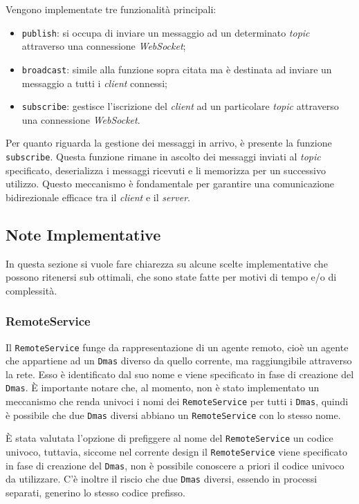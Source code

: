 Vengono implementate tre funzionalità principali:
\begin{itemize}
    \item \texttt{publish}: si occupa di inviare un messaggio ad un determinato \textit{topic} attraverso una connessione \textit{WebSocket};
    \item \texttt{broadcast}: simile alla funzione sopra citata ma è destinata ad inviare un messaggio a tutti i \textit{client} connessi;
    \item \texttt{subscribe}: gestisce l'iscrizione del \textit{client} ad un particolare \textit{topic} attraverso una connessione \textit{WebSocket}.
\end{itemize}

Per quanto riguarda la gestione dei messaggi in arrivo, è presente la funzione \texttt{subscribe}.
Questa funzione rimane in ascolto dei messaggi inviati al \textit{topic} specificato, deserializza i messaggi ricevuti e li memorizza per un successivo utilizzo.
Questo meccanismo è fondamentale per garantire una comunicazione bidirezionale efficace tra il \textit{client} e il  \textit{server}.

\subsection{Note Implementative}
In questa sezione si vuole fare chiarezza su alcune scelte implementative che possono ritenersi sub ottimali, che sono state fatte per motivi di tempo e/o di complessità.

\subsubsection{RemoteService}
Il \texttt{RemoteService} funge da rappresentazione di un agente remoto, cioè un agente che appartiene ad un \texttt{Dmas} diverso da quello corrente, ma raggiungibile attraverso la rete.
Esso è identificato dal suo nome e viene specificato in fase di creazione del \texttt{Dmas}. È importante notare che, al momento, non è stato implementato un meccanismo che renda
univoci i nomi dei \texttt{RemoteService} per tutti i \texttt{Dmas}, quindi è possibile che due \texttt{Dmas} diversi abbiano un \texttt{RemoteService} con lo stesso nome.

È stata valutata l'opzione di prefiggere al nome del \texttt{RemoteService} un codice univoco, tuttavia, siccome nel corrente design il \texttt{RemoteService} viene specificato in fase di creazione
del \texttt{Dmas}, non è possibile conoscere a priori il codice univoco da utilizzare. C'è inoltre il riscio che due \texttt{Dmas} diversi, essendo in processi separati, generino lo stesso codice
prefisso.

